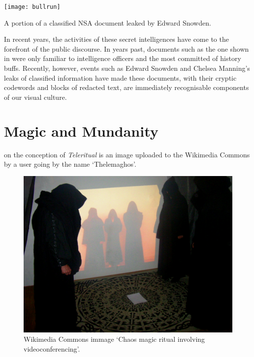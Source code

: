 \documentclass[a4paper,nobib]{tufte-handout}
\begin{document}
\begin{marginfigure}
    \texttt{[image: bullrun]}
    \caption{A portion of a classified NSA document leaked by Edward Snowden.}
    \label{fig:bullrun}
\end{marginfigure}
In recent years, the activities of these secret intelligences have come to the forefront of the public discourse. In years past, documents such as the one shown in  were only familiar to intelligence officers and the most committed of history buffs. Recently, however, events such as Edward Snowden and Chelsea Manning's leaks of classified information have made these documents, with their cryptic codewords and blocks of redacted text, are immediately recognisable components of our visual culture.

\section{Magic and Mundanity}


 on the conception of \emph{Teleritual} is an image uploaded to the Wikimedia Commons by a user going by the name `Thelemaghos'.

\begin{figure}
    \includegraphics{videoconferencing}
    \caption{Wikimedia Commons immage `Chaos magic ritual involving videoconferencing'.}
    \label{fig:videoconf}
\end{figure}
\end{document}
